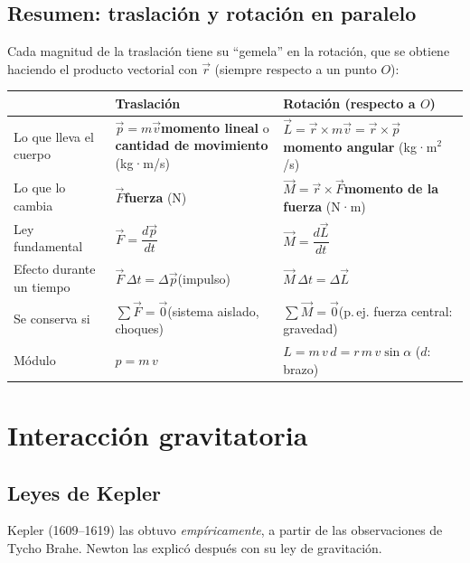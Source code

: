 \documentclass[11pt,a4paper]{article}
\begin{document}
\subsection*{Resumen: traslación y rotación en paralelo}
Cada magnitud de la traslación tiene su ``gemela'' en la rotación, que se obtiene haciendo el producto vectorial con $\vec r$ (siempre respecto a un punto $O$):
\begin{center}
\renewcommand{\arraystretch}{1.7}
\begin{tabular}{|>{\raggedright\arraybackslash}p{3.3cm}|>{\raggedright\arraybackslash}p{5.3cm}|>{\raggedright\arraybackslash}p{5.8cm}|}
\hline
 & \textbf{Traslación} & \textbf{Rotación (respecto a $O$)}\\ \hline
Lo que lleva el cuerpo & $\vec p=m\vec v$\newline \textbf{momento lineal} o \textbf{cantidad de movimiento} (kg·m/s) & $\vec L=\vec r\times m\vec v=\vec r\times\vec p$\newline \textbf{momento angular} (kg·m$^2$/s)\\ \hline
Lo que lo cambia & $\vec F$\newline \textbf{fuerza} (N) & $\vec M=\vec r\times\vec F$\newline \textbf{momento de la fuerza} (N·m)\\ \hline
Ley fundamental & $\vec F=\dfrac{d\vec p}{dt}$ & $\vec M=\dfrac{d\vec L}{dt}$\\ \hline
Efecto durante un tiempo & $\vec F\,\Delta t=\Delta\vec p$\newline (impulso) & $\vec M\,\Delta t=\Delta\vec L$\\ \hline
Se conserva si & $\sum\vec F=\vec 0$\newline (sistema aislado, choques) & $\sum\vec M=\vec 0$\newline (p.\,ej. fuerza central: gravedad)\\ \hline
Módulo & $p=m\,v$ & $L=m\,v\,d=r\,m\,v\sin\alpha$ \quad ($d$: brazo)\\ \hline
\end{tabular}
\end{center}

\section{Interacción gravitatoria}
\subsection{Leyes de Kepler}
Kepler (1609--1619) las obtuvo \emph{empíricamente}, a partir de las observaciones de Tycho Brahe. Newton las explicó después con su ley de gravitación.
\end{document}
